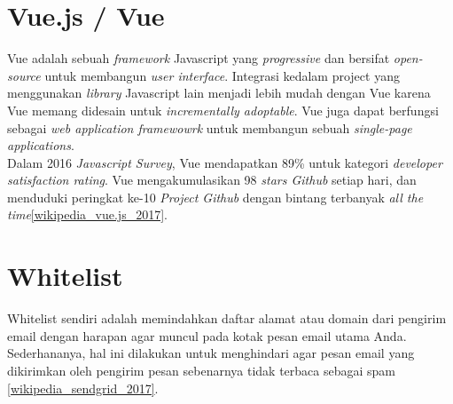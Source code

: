 	\section{Vue.js / Vue}
	  Vue adalah sebuah \textit{framework} Javascript yang \textit{progressive} dan bersifat \textit{open-source} untuk membangun \textit{user interface}. Integrasi kedalam project yang menggunakan \textit{library } Javascript lain menjadi lebih mudah dengan Vue karena Vue memang didesain untuk \textit{incrementally adoptable}. Vue juga dapat berfungsi sebagai \textit{web application framewowrk} untuk membangun sebuah \textit{single-page applications}.
	  \\ \indent
	  Dalam 2016 \textit{Javascript Survey}, Vue mendapatkan 89\% untuk kategori \textit{developer satisfaction rating}. Vue mengakumulasikan 98 \textit{stars Github} setiap hari, dan menduduki peringkat ke-10 \textit{Project Github} dengan bintang terbanyak \textit{all the time}\ref{wikipedia_vue.js_2017}.
	  
	  
	
	
	\section{Whitelist}
	Whitelist sendiri adalah memindahkan daftar alamat atau domain dari pengirim email dengan harapan agar muncul pada kotak pesan email utama Anda. Sederhananya, hal ini dilakukan untuk menghindari agar pesan email yang dikirimkan oleh pengirim pesan sebenarnya tidak terbaca sebagai spam \ref{wikipedia_sendgrid_2017}.
